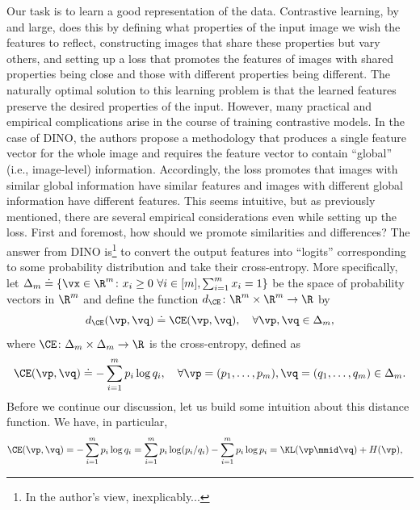 \documentclass[../../book-main.tex]{subfiles}
\begin{document}
Our task is to learn a good representation of the data.
Contrastive
learning, by and large, does this by defining what properties of the
input image we wish the features to reflect, constructing images
that share these properties but vary others, and setting up a loss
that promotes the features of images with shared properties being
close and those with different properties being different.
The
naturally optimal solution to this learning problem is that the
learned features preserve the desired properties of the input.
However, many practical and empirical complications arise in the
course of training contrastive models.
In the case of DINO, the authors propose a methodology that
produces a single feature vector for the whole image and requires the
feature vector to contain ``global'' (i.e., image-level) information.
Accordingly, the loss promotes that images with similar global
information have similar features and images with different global
information have different features.
This seems intuitive, but as previously mentioned, there are several
empirical considerations even while setting up the loss.
First and
foremost, how should we promote similarities and differences? The
answer from DINO \citep{caron2021emerging} is\footnote{In the
author's view, inexplicably...} to convert the output features into
``logits'' corresponding to some probability distribution and take
their cross-entropy.
More specifically, let \(\Delta_{m} \doteq \{\vx
        \in \R^{m} \colon x_{i} \geq 0\ \forall i \in [m], \sum_{i =
1}^{m}x_{i} = 1\}\) be the space of probability vectors in \(\R^{m}\)
and define the function \(d_{\CE} \colon \R^{m} \times \R^{m} \to \R\) by
\begin{equation}\label{eq:cross_entropy_difference}
    d_{\CE}(\vp, \vq) \doteq \CE(\vp, \vq), \quad \forall \vp, \vq
    \in \Delta_{m} ,
\end{equation}
where \(\CE \colon \Delta_{m} \times \Delta_{m} \to \R\) is the
cross-entropy, defined as
\begin{equation}\label{eq:expts_def_ce}
    \CE(\vp, \vq) \doteq -\sum_{i = 1}^{m}p_{i}\log q_{i}, \quad
    \forall \vp = (p_{1}, \dots, p_{m}), \vq = (q_{1}, \dots, q_{m})
    \in \Delta_{m} .
\end{equation}
Before we continue our discussion, let us build some intuition about
this distance function.
We have, in particular,
\begin{align}
    \CE(\vp, \vq)
    &= -\sum_{i = 1}^{m}p_{i}\log q_{i} = \sum_{i = 1}^{m}p_{i}\log(p_{i}/q_{i})
    - \sum_{i = 1}^{m}p_{i}\log p_{i} = \KL(\vp\mmid \vq) + H(\vp) ,
\end{align}
\end{document}
